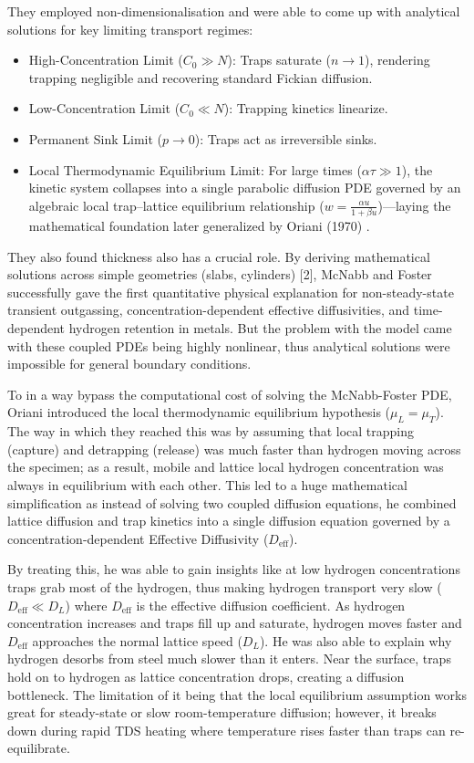\documentclass[a4paper,12pt,oneside]{report}
\begin{document}
They employed non-dimensionalisation and were able to come up with analytical solutions for key limiting transport regimes:
\begin{itemize}
    \item High-Concentration Limit ($C_0 \gg N$): Traps saturate ($n \to 1$), rendering trapping negligible and recovering standard Fickian diffusion.
    \item Low-Concentration Limit ($C_0 \ll N$): Trapping kinetics linearize.
    \item Permanent Sink Limit ($p \to 0$): Traps act as irreversible sinks.
    \item Local Thermodynamic Equilibrium Limit: For large times ($\alpha \tau \gg 1$), the kinetic system collapses into a single parabolic diffusion PDE governed by an algebraic local trap--lattice equilibrium relationship ($w = \frac{\alpha u}{1 + \beta u}$)—laying the mathematical foundation later generalized by Oriani (1970) \cite{Oriani1970}.
\end{itemize}

They also found thickness also has a crucial role. By deriving mathematical solutions across simple geometries (slabs, cylinders) [2], McNabb and Foster successfully gave the first quantitative physical explanation for non-steady-state transient outgassing, concentration-dependent effective diffusivities, and time-dependent hydrogen retention in metals. But the problem with the model came with these coupled PDEs being highly nonlinear, thus analytical solutions were impossible for general boundary conditions.

To in a way bypass the computational cost of solving the McNabb-Foster PDE, Oriani \cite{Oriani1970} introduced the local thermodynamic equilibrium hypothesis ($\mu_L = \mu_T$). The way in which they reached this was by assuming that local trapping (capture) and detrapping (release) was much faster than hydrogen moving across the specimen; as a result, mobile and lattice local hydrogen concentration was always in equilibrium with each other. This led to a huge mathematical simplification as instead of solving two coupled diffusion equations, he combined lattice diffusion and trap kinetics into a single diffusion equation governed by a concentration-dependent Effective Diffusivity ($D_{\text{eff}}$).

By treating this, he was able to gain insights like at low hydrogen concentrations traps grab most of the hydrogen, thus making hydrogen transport very slow ($D_{\text{eff}} \ll D_L$) where $D_{\text{eff}}$ is the effective diffusion coefficient. As hydrogen concentration increases and traps fill up and saturate, hydrogen moves faster and $D_{\text{eff}}$ approaches the normal lattice speed ($D_L$). He was also able to explain why hydrogen desorbs from steel much slower than it enters. Near the surface, traps hold on to hydrogen as lattice concentration drops, creating a diffusion bottleneck. The limitation of it being that the local equilibrium assumption works great for steady-state or slow room-temperature diffusion; however, it breaks down during rapid TDS heating where temperature rises faster than traps can re-equilibrate.
\end{document}
